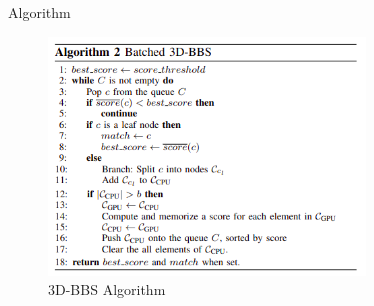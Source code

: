\begin{frame}{Algorithm}
\begin{figure}
    \centering
    \includegraphics[width=0.75\textwidth]{figures/3dbbs_algorithm.png}
    \caption{3D-BBS Algorithm \cite{aoki20243dbbsgloballocalization3d}}
\end{figure}
\end{frame}

